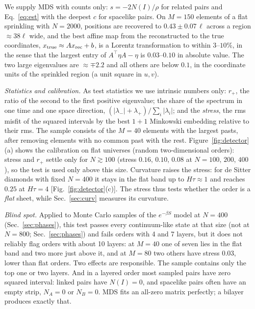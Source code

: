 \documentclass[prd,twocolumn,superscriptaddress,nofootinbib,amsmath,amssymb,floatfix]{revtex4-2}
\begin{document}
We supply MDS with counts only: $s=-2N(I)/\rho$ for related pairs and Eq.~\eqref{eq:est} with the deepest $c$ for spacelike pairs. On $M=150$ elements of a flat sprinkling with $N=2000$, positions are recovered to $0.43\pm0.07\,\ell$ across a region $\approx38\ell$ wide, and the best affine map from the reconstructed to the true coordinates, $x_{\rm true}\approx Ax_{\rm rec}+b$, is a Lorentz transformation to within $3$--$10\%$, in the sense that the largest entry of $A^{\top}\eta A-\eta$ is $0.03$--$0.10$ in absolute value. The two large eigenvalues are $\approx\mp2.2$ and all others are below $0.1$, in the coordinate units of the sprinkled region (a unit square in $u,v$).

\emph{Statistics and calibration.} As test statistics we use intrinsic numbers only: $r_+$, the ratio of the second to the first positive eigenvalue; the share of the spectrum in one time and one space direction, $(|\lambda_-|+\lambda_+)/\sum_i|\lambda_i|$; and the \emph{stress}, the rms misfit of the squared intervals by the best $1+1$ Minkowski embedding relative to their rms. The sample consists of the $M=40$ elements with the largest pasts, after removing elements with no common past with the rest. Figure~\ref{fig:detector}(a) shows the calibration on flat universes (random two-dimensional orders): stress and $r_+$ settle only for $N\gtrsim100$ (stress $0.16$, $0.10$, $0.08$ at $N=100$, $200$, $400$), so the test is used only above this size. Curvature raises the stress: for de Sitter diamonds with fixed $N=400$ it stays in the flat band up to $H\tau\approx1$ and reaches $0.25$ at $H\tau=4$ [Fig.~\ref{fig:detector}(c)]. The stress thus tests whether the order is a \emph{flat} sheet, while Sec.~\ref{sec:curv} measures its curvature.

\emph{Blind spot.} Applied to Monte Carlo samples of the $e^{-\beta S}$ model at $N=400$ (Sec.~\ref{sec:phases}), this test passes every continuum-like state at that size (not at $N=800$; Sec.~\ref{sec:phases}) and fails orders with 4 and 7 layers, but it does not reliably flag orders with about 10 layers: at $M=40$ one of seven lies in the flat band and two more just above it, and at $M=80$ two others have stress $0.03$, lower than flat orders. Two effects are responsible. The sample contains only the top one or two layers. And in a layered order most sampled pairs have zero squared interval: linked pairs have $N(I)=0$, and spacelike pairs often have an empty strip, $N_A=0$ or $N_B=0$. MDS fits an all-zero matrix perfectly; a bilayer produces exactly that.
\end{document}
